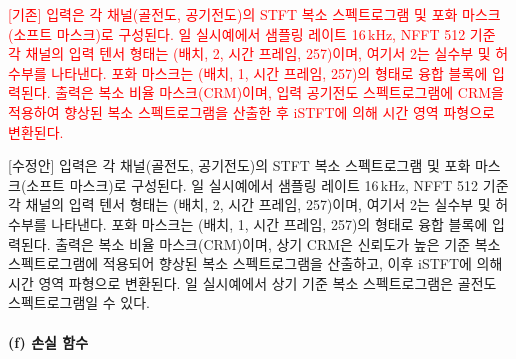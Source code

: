 \documentclass{article}
\newcommand{\reviewold}[1]{{\par\noindent\textcolor{red}{[기존] #1}}}
\newcommand{\reviewnew}[1]{{\par\noindent\textcolor{customblue}{[수정안] #1}}}
\newcommand{\reviewpair}[2]{\reviewold{#1}\reviewnew{#2}\par}
\begin{document}
\reviewpair{입력은 각 채널(골전도, 공기전도)의 STFT 복소 스펙트로그램 및 포화 마스크(소프트 마스크)로 구성된다. 일 실시예에서 샘플링 레이트 16\,kHz, NFFT 512 기준 각 채널의 입력 텐서 형태는 (배치, 2, 시간 프레임, 257)이며, 여기서 2는 실수부 및 허수부를 나타낸다. 포화 마스크는 (배치, 1, 시간 프레임, 257)의 형태로 융합 블록에 입력된다. 출력은 복소 비율 마스크(CRM)이며, 입력 공기전도 스펙트로그램에 CRM을 적용하여 향상된 복소 스펙트로그램을 산출한 후 iSTFT에 의해 시간 영역 파형으로 변환된다.}{입력은 각 채널(골전도, 공기전도)의 STFT 복소 스펙트로그램 및 포화 마스크(소프트 마스크)로 구성된다. 일 실시예에서 샘플링 레이트 16\,kHz, NFFT 512 기준 각 채널의 입력 텐서 형태는 (배치, 2, 시간 프레임, 257)이며, 여기서 2는 실수부 및 허수부를 나타낸다. 포화 마스크는 (배치, 1, 시간 프레임, 257)의 형태로 융합 블록에 입력된다. 출력은 복소 비율 마스크(CRM)이며, 상기 CRM은 신뢰도가 높은 기준 복소 스펙트로그램에 적용되어 향상된 복소 스펙트로그램을 산출하고, 이후 iSTFT에 의해 시간 영역 파형으로 변환된다. 일 실시예에서 상기 기준 복소 스펙트로그램은 골전도 스펙트로그램일 수 있다.}

\paragraph{(f) 손실 함수}
\end{document}
